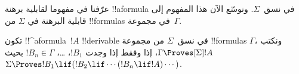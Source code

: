 \documentclass[../../../include/open-logic-section]{subfiles}
\begin{document}


عرّفنا في  مفهوما لقابلية برهنة !!a{formula}
في نسق~$\Sigma$. ونوسّع الآن هذا المفهوم إلى قابلية البرهنة في
$\Sigma$ من !!{formula}s في مجموعة~$\Gamma$.

\begin{defn}
  تكون !!^a{formula}~$!A$ !!{derivable} في نسق~$\Sigma$ من مجموعة
  !!{formula}s $\Gamma$، ونكتب $\Gamma \Proves[\Sigma] !A$، إذا
  وفقط إذا وجدت $!B_1$، \dots، $!B_n \in \Gamma$ بحيث
  $\Sigma \Proves !B_1 \lif (!B_2 \lif \cdots (!B_n \lif !A)
  \cdots)$.
\end{defn}
\end{document}
